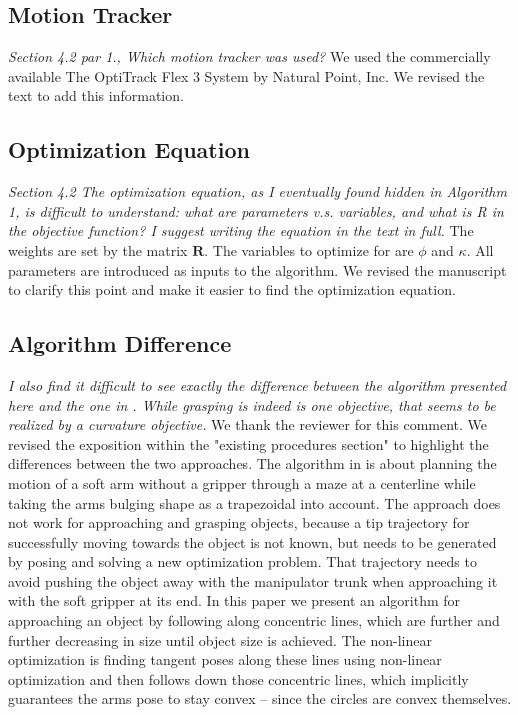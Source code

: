 \documentclass[letterpaper, 10 pt, twocolumn, conference]{article}
\begin{document}
\subsection{Motion Tracker}
\textit{Section 4.2 par 1., Which motion tracker was used?}
We used the commercially available The OptiTrack Flex 3 System by Natural Point, Inc. We revised the text to add this information.
%
\subsection{Optimization Equation}
\textit{Section 4.2 The optimization equation, as I eventually found hidden in Algorithm 1, is difficult to understand: what are parameters v.s. variables, and what is R in the objective function? I suggest writing the equation in the text in full.}
%
The weights are set by the matrix $\mathbf{R}$. The variables to optimize for are $\phi$ and $\kappa$. All parameters are introduced as inputs to the algorithm. We revised the manuscript to clarify this point and make it easier to find the optimization equation. 
%
\subsection{Algorithm Difference}
\textit{I also find it difficult to see exactly the difference between the algorithm presented here and the one in \cite{marchese2014whole}. While grasping is indeed is one objective, that seems to be realized by a curvature objective.} 
%
We thank the reviewer for this comment. We revised the exposition within the "existing procedures section" to highlight the differences between the two approaches. The algorithm in \cite{marchese2014whole} is about planning the motion of a soft arm without a gripper through a maze at a centerline while taking the arms bulging shape as a trapezoidal into account. The approach does not work for approaching and grasping objects, because a tip trajectory for successfully moving towards the object is not known, but needs to be generated by posing and solving a new optimization problem. That trajectory needs to avoid pushing the object away with the manipulator trunk when approaching it with the soft gripper at its end. In this paper we present an algorithm for approaching an object by following along concentric lines, which are further and further decreasing in size until object size is achieved. The non-linear optimization is finding tangent poses along these lines using non-linear optimization and then follows down those concentric lines, which implicitly guarantees the arms pose to stay convex – since the circles are convex themselves.
%
\end{document}
